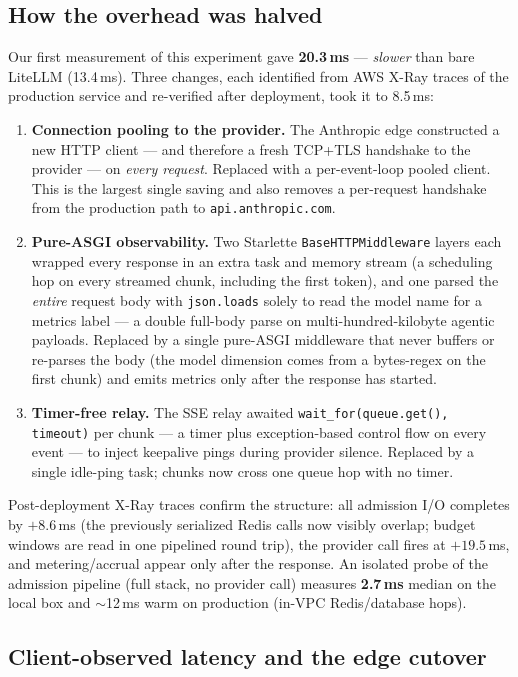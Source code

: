 \documentclass[10pt]{article}
\newcommand{\head}[1]{\textbf{#1}}
\begin{document}
\subsection{How the overhead was halved}\label{sec:engineering}
Our first measurement of this experiment gave \textbf{20.3\,ms} --- \emph{slower} than bare LiteLLM (13.4\,ms). Three changes, each identified from AWS X-Ray traces of the production service and re-verified after deployment, took it to 8.5\,ms:
\begin{enumerate}\itemsep2pt
\item \head{Connection pooling to the provider.} The Anthropic edge constructed a new HTTP client --- and therefore a fresh TCP+TLS handshake to the provider --- on \emph{every request}. Replaced with a per-event-loop pooled client. This is the largest single saving and also removes a per-request handshake from the production path to \texttt{api.anthropic.com}.
\item \head{Pure-ASGI observability.} Two Starlette \texttt{BaseHTTPMiddleware} layers each wrapped every response in an extra task and memory stream (a scheduling hop on every streamed chunk, including the first token), and one parsed the \emph{entire} request body with \texttt{json.loads} solely to read the model name for a metrics label --- a double full-body parse on multi-hundred-kilobyte agentic payloads. Replaced by a single pure-ASGI middleware that never buffers or re-parses the body (the model dimension comes from a bytes-regex on the first chunk) and emits metrics only after the response has started.
\item \head{Timer-free relay.} The SSE relay awaited \texttt{wait\_for(queue.get(), timeout)} per chunk --- a timer plus exception-based control flow on every event --- to inject keepalive pings during provider silence. Replaced by a single idle-ping task; chunks now cross one queue hop with no timer.
\end{enumerate}
Post-deployment X-Ray traces confirm the structure: all admission I/O completes by $+8.6$\,ms (the previously serialized Redis calls now visibly overlap; budget windows are read in one pipelined round trip), the provider call fires at $+19.5$\,ms, and metering/accrual appear only after the response. An isolated probe of the admission pipeline (full stack, no provider call) measures \textbf{2.7\,ms} median on the local box and $\sim$12\,ms warm on production (in-VPC Redis/database hops).

\subsection{Client-observed latency and the edge cutover}\label{sec:client}
\end{document}
